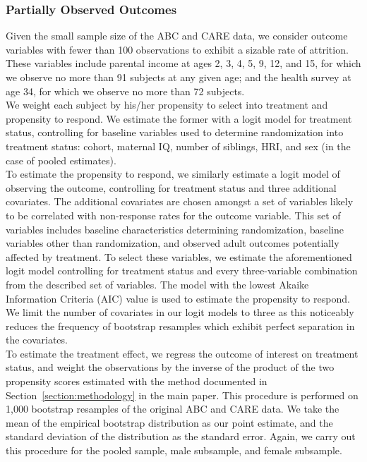 \subsubsection{Partially Observed Outcomes}
\label{app:method_partialobs}

\noindent Given the small sample size of the ABC and CARE data, we consider outcome variables with fewer than 100 observations
to exhibit a sizable rate of attrition. These variables include parental income at ages 2, 3, 4, 5, 9, 12,
and 15, for which we observe no more than 91 subjects at any given age; and the health survey at
age 34, for which we observe no more than 72 subjects. \\

\noindent We weight each subject by
his/her propensity to select into treatment and propensity to respond. We estimate the
former with a logit model for treatment status, controlling for baseline
variables used to determine randomization into treatment status: cohort,
maternal IQ, number of siblings, HRI, and sex (in the case of pooled estimates). \\

\noindent To estimate the propensity to respond, we similarly estimate a logit model of observing the outcome,
controlling for treatment status and three additional covariates. The additional covariates are
chosen amongst a set of variables likely to be correlated with non-response rates for the outcome variable.
This set of variables includes baseline characteristics determining randomization,
baseline variables other than randomization, and observed adult outcomes potentially affected by
treatment. To select these variables, we estimate the
aforementioned logit model controlling for treatment status and every three-variable combination from
the described set of variables. The model with the lowest Akaike Information Criteria (AIC) value is used to estimate the propensity
to respond. We limit the number of covariates in our logit models to three as this noticeably reduces the frequency of bootstrap resamples which exhibit perfect separation in the covariates. \\

\noindent To estimate the treatment effect, we regress the outcome of interest on treatment status, and weight the
observations by the inverse of the product of the two propensity scores estimated with the method
documented in Section~\ref{section:methodology} in the main paper. This procedure is performed on 1,000 bootstrap resamples of the original ABC and CARE data.
We take the mean of the empirical bootstrap distribution as our point estimate, and the standard deviation
of the distribution as the standard error. Again, we carry out this procedure for the
pooled sample, male subsample, and female subsample. \\

